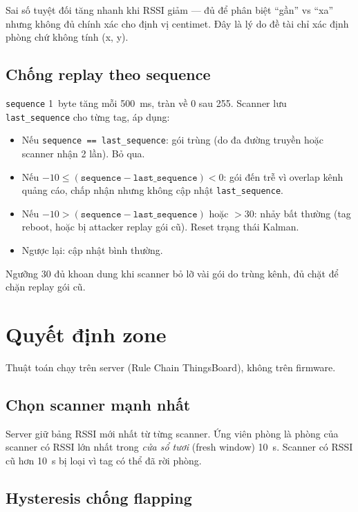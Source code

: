 Sai số tuyệt đối tăng nhanh khi RSSI giảm --- đủ để phân biệt ``gần'' vs ``xa'' nhưng không đủ chính xác cho định vị centimet. Đây là lý do đề tài chỉ xác định phòng chứ không tính (x, y).

\subsection{Chống replay theo sequence}

\texttt{sequence} 1~byte tăng mỗi 500~ms, tràn về 0 sau 255. Scanner lưu \texttt{last\_sequence} cho từng tag, áp dụng:

\begin{itemize}
    \item Nếu \texttt{sequence == last\_sequence}: gói trùng (do đa đường truyền hoặc scanner nhận 2 lần). Bỏ qua.
    \item Nếu $-10 \leq (\texttt{sequence} - \texttt{last\_sequence}) < 0$: gói đến trễ vì overlap kênh quảng cáo, chấp nhận nhưng không cập nhật \texttt{last\_sequence}.
    \item Nếu $-10 > (\texttt{sequence} - \texttt{last\_sequence})$ hoặc $> 30$: nhảy bất thường (tag reboot, hoặc bị attacker replay gói cũ). Reset trạng thái Kalman.
    \item Ngược lại: cập nhật bình thường.
\end{itemize}

Ngưỡng 30 đủ khoan dung khi scanner bỏ lỡ vài gói do trùng kênh, đủ chặt để chặn replay gói cũ.

\section{Quyết định zone}

Thuật toán chạy trên server (Rule Chain ThingsBoard), không trên firmware.

\subsection{Chọn scanner mạnh nhất}

Server giữ bảng RSSI mới nhất từ từng scanner. Ứng viên phòng là phòng của scanner có RSSI lớn nhất trong \textit{cửa sổ tươi} (fresh window) 10~s. Scanner có RSSI cũ hơn 10~s bị loại vì tag có thể đã rời phòng.

\subsection{Hysteresis chống flapping}

